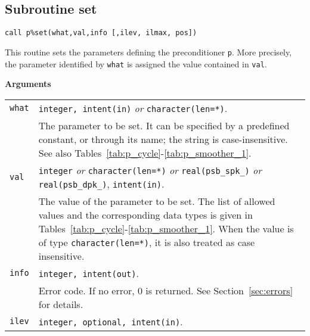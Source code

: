 \clearpage

\subsection{Subroutine set\label{sec:precset}}

\begin{center}
\verb|call p%set(what,val,info [,ilev, ilmax, pos])|
\end{center}

\noindent
This routine sets the parameters defining the preconditioner \verb|p|. More
precisely, the parameter identified by \verb|what| is assigned the value
contained in \verb|val|. 

{\baselineskip\noindent\large\bfseries Arguments} \smallskip

\begin{tabular}{p{1.2cm}p{12cm}}
\verb|what|   & \verb|integer, intent(in)| \emph{or} \verb|character(len=*)|. \\
              & The parameter to be set. It can be specified by 
                a predefined constant, or through its name; the string
                is case-insensitive. See also
                Tables~\ref{tab:p_cycle}-\ref{tab:p_smoother_1}.\\ 
\verb|val |   & \verb|integer| \emph{or} \verb|character(len=*)| \emph{or}
                \verb|real(psb_spk_)| \emph{or} \verb|real(psb_dpk_)|,
                \verb|intent(in)|.\\
              & The value of the parameter to be set. The list of allowed
                values and the corresponding data types is given in
                Tables~\ref{tab:p_cycle}-\ref{tab:p_smoother_1}.
                When the value is of type \verb|character(len=*)|,
                it is also treated as case insensitive.\\
\verb|info|   & \verb|integer, intent(out)|.\\
              & Error code. If no error, 0 is returned. See Section~\ref{sec:errors}
                for details.\\
\verb|ilev|   & \verb|integer, optional, intent(in)|.\\

\end{tabular}
